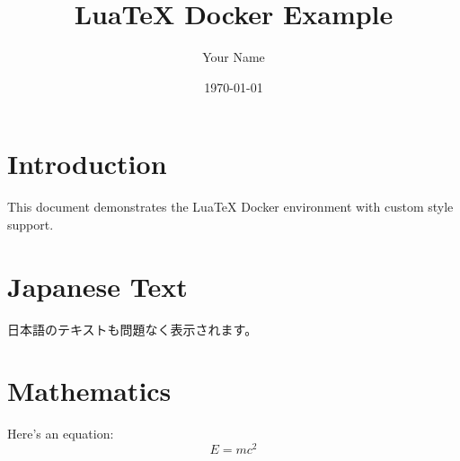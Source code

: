 \documentclass[11pt,a4paper]{ltjsarticle}
\title{LuaTeX Docker Example}
\author{Your Name}
\date{\today}
\begin{document}
\maketitle

\section{Introduction}
This document demonstrates the LuaTeX Docker environment with custom style support.


\section{Japanese Text}
日本語のテキストも問題なく表示されます。

\section{Mathematics}
Here's an equation:
\begin{equation}
    E = mc^2
\end{equation}
\end{document}
